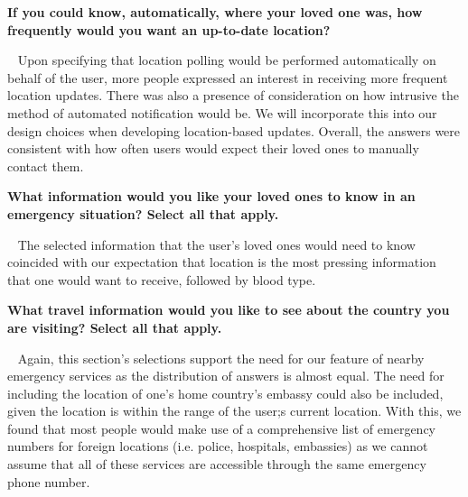 \documentclass{scrreprt}
\begin{document}
\textbf{If you could know, automatically, where your loved one was, how frequently would you want an up-to-date location?}
\par ~ Upon specifying that location polling would be performed automatically on behalf of the user, more people expressed an interest in receiving more frequent location updates. There was also a presence of consideration on how intrusive the method of automated notification would be. We will incorporate this into our design choices when developing location-based updates. Overall, the answers were consistent with how often users would expect their loved ones to manually contact them. 

\textbf{What information would you like your loved ones to know in an emergency situation? Select all that apply.}
\par ~ The selected information that the user's loved ones would need to know coincided with our expectation that location is the most pressing information that one would want to receive, followed by blood type.

\textbf{What travel information would you like to see about the country you are visiting? Select all that apply.}
\par ~ Again, this section's selections support the need for our feature of nearby emergency services as the distribution of answers is almost equal. The need for including the location of one's home country's embassy could also be included, given the location is within the range of the user;s current location. With this, we found that most people would make use of a comprehensive list of emergency numbers for foreign locations (i.e. police, hospitals, embassies) as we cannot assume that all of these services are accessible through the same emergency phone number.
\end{document}
